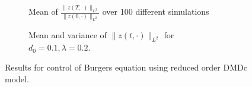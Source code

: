 \documentclass[10pt,a4paper]{amsart}
\begin{document}


\begin{figure}
\centering
    \begin{subfigure}[b]{0.45\textwidth}
        \centering
        
        \caption{Mean of $\frac{\|z(T,\cdot)\|_{L^2}}{\|z(0,\cdot)\|_{L^2}}$ over 100 different simulations}
        \label{fig:heatmap-dmdc}
    \end{subfigure}
%
    \begin{subfigure}[b]{0.45\textwidth}
        \centering
        
        \caption{Mean and variance of $\|z(t,\cdot)\|_{L^2}$ for $d_0=0.1,\lambda=0.2$.}
        \label{fig:time-dmdc}
    \end{subfigure}
\caption{Results for control of Burgers equation using reduced order DMDc model.}
\label{fig:dmdc}
\end{figure}
\end{document}
